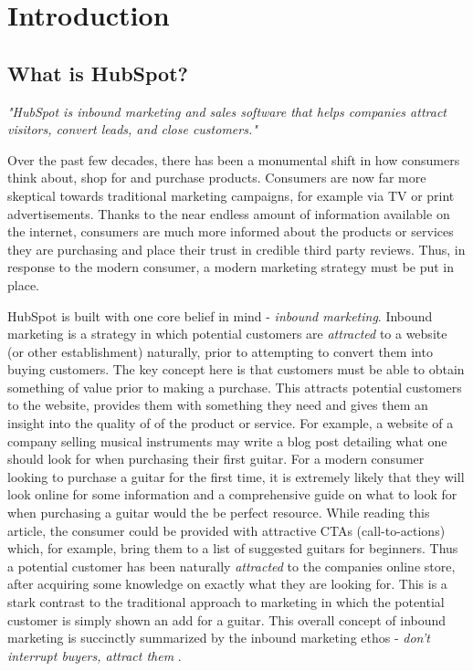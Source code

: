\chapter{Introduction}

\section{What is HubSpot?}
\textit{"HubSpot is inbound marketing and sales software that helps companies attract visitors, convert leads, and close customers."} \cite{whatIsHubSpot}\hfill\break

Over the past few decades, there has been a monumental shift in how consumers think about, shop for and purchase products. Consumers are now far more skeptical towards traditional marketing campaigns, for example via TV or print advertisements. Thanks to the near endless amount of information available on the internet, consumers are much more informed about the products or services they are purchasing and place their trust in credible third party reviews. Thus, in response to the modern consumer, a modern marketing strategy must be put in place. 

HubSpot is built with one core belief in mind - \textit{inbound marketing}. Inbound marketing is a strategy in which potential customers are \textit{attracted} to a website (or other establishment) naturally, prior to attempting to convert them into buying customers. The key concept here is that customers must be able to obtain something of value prior to making a purchase. This attracts potential customers to the website, provides them with something they need and gives them an insight into the quality of of the product or service. For example, a website of a company selling musical instruments may write a blog post detailing what one should look for when purchasing their first guitar. For a modern consumer looking to purchase a guitar for the first time, it is extremely likely that they will look online for some information and a comprehensive guide on what to look for when purchasing a guitar would the be perfect resource. While reading this article, the consumer could be provided with attractive CTAs (call-to-actions) which, for example, bring them to a list of suggested guitars for beginners. Thus a potential customer has been naturally \textit{attracted} to the companies online store, after acquiring some knowledge on exactly what they are looking for. This is a stark contrast to the traditional approach to marketing in which the potential customer is simply shown an add for a guitar. This overall concept of inbound marketing is succinctly summarized by the inbound marketing ethos - \textit{don't interrupt buyers, attract them} \cite{whatIsHubSpot}.

